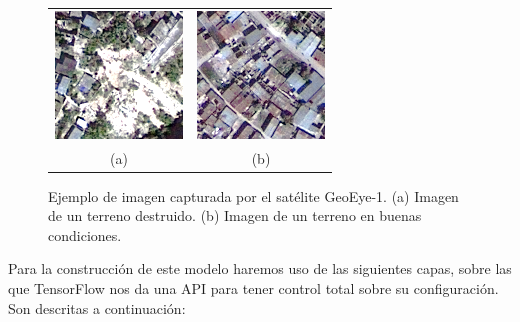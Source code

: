 \begin{figure}[h]
\centering
    \begin{tabular}{cc}
        \includegraphics[height=0.35\textwidth]{images/chapter2/post_114_019.png} &
        \includegraphics[height=0.35\textwidth]{images/chapter2/post_001_079.png}\\
        (a) & (b)\\
    \end{tabular}
    \caption{Ejemplo de imagen capturada por el satélite GeoEye-1. (a) Imagen de un terreno destruido. (b) Imagen de un terreno en buenas condiciones.}    \label{fig:terrain}
\end{figure}
Para la construcción de este modelo haremos uso de las siguientes capas, sobre las que TensorFlow nos da una API para tener control total sobre su configuración. Son descritas a continuación:

